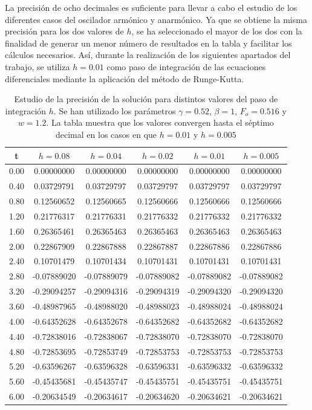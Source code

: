 \documentclass[11pt]{article}
\begin{document}
La precisión de ocho decimales es suficiente para llevar a cabo el estudio de los diferentes casos del oscilador armónico y anarmónico. Ya que se obtiene la misma precisión para los dos valores de $h$, se ha seleccionado el mayor de los dos con la finalidad de generar un menor número de resultados en la tabla y facilitar los cálculos necesarios. Así, durante la realización de los siguientes apartados del trabajo, se utiliza $h = 0.01$ como paso de integración de las ecuaciones diferenciales mediante la aplicación del método de Runge-Kutta.  

\begin{table}[h]
\centering
\begin{tabular}{|c|c|c|c|c|c|}
\hline
t & $h = 0.08$ & $h = 0.04$ & $h = 0.02$ & $h = 0.01$ & $h = 0.005$ \\
\hline
0.00 & 0.00000000 & 0.00000000 & 0.00000000 & 0.00000000 & 0.00000000 \\ 
0.40 & 0.03729791 & 0.03729797 & 0.03729797 & 0.03729797 & 0.03729797 \\ 
0.80 & 0.12560652 & 0.12560665 & 0.12560666 & 0.12560666 & 0.12560666 \\ 
1.20 & 0.21776317 & 0.21776331 & 0.21776332 & 0.21776332 & 0.21776332 \\ 
1.60 & 0.26365461 & 0.26365463 & 0.26365463 & 0.26365463 & 0.26365463 \\ 
2.00 & 0.22867909 & 0.22867888 & 0.22867887 & 0.22867886 & 0.22867886 \\ 
2.40 & 0.10701479 & 0.10701434 & 0.10701431 & 0.10701431 & 0.10701431 \\ 
2.80 & -0.07889020 & -0.07889079 & -0.07889082 & -0.07889082 & -0.07889082 \\ 
3.20 & -0.29094257 & -0.29094316 & -0.29094319 & -0.29094320 & -0.29094320 \\ 
3.60 & -0.48987965 & -0.48988020 & -0.48988023 & -0.48988024 & -0.48988024 \\ 
4.00 & -0.64352628 & -0.64352678 & -0.64352682 & -0.64352682 & -0.64352682 \\ 
4.40 & -0.72838016 & -0.72838067 & -0.72838070 & -0.72838070 & -0.72838070 \\ 
4.80 & -0.72853695 & -0.72853749 & -0.72853753 & -0.72853753 & -0.72853753 \\ 
5.20 & -0.63596267 & -0.63596328 & -0.63596331 & -0.63596332 & -0.63596332 \\ 
5.60 & -0.45435681 & -0.45435747 & -0.45435751 & -0.45435751 & -0.45435751 \\ 
6.00 & -0.20634549 & -0.20634617 & -0.20634620 & -0.20634621 & -0.20634621 \\ 
\hline
\end{tabular}
\caption{Estudio de la precisión de la solución para distintos valores del paso de integración $h$. Se han utilizado los parámetros
$\gamma=0.52$, $\beta=1$, $F_o = 0.516$ y $w=1.2$. La tabla muestra que los valores convergen hasta el séptimo decimal en los casos en que $h = 0.01$ y $h=0.005$}
\label{tab:precision}
\end{table}
\end{document}
